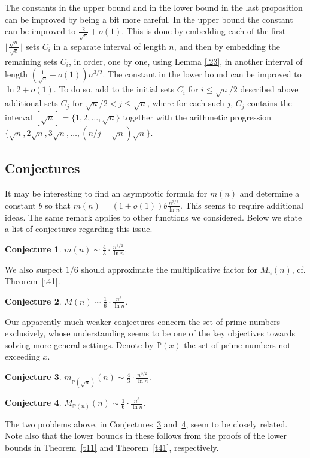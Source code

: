 \documentclass[12pt]{amsart}
\theoremstyle{plain}
\newtheorem{conjecture}{Conjecture}
\numberwithin{equation}{section}
\begin{document}
The constants in the upper bound and in the lower bound in the last proposition can be improved by being a bit more careful. In the upper bound the constant can be improved to $\frac{2}{\sqrt e}+o(1)$. This is done
by embedding each of the first $\lfloor \frac{\sqrt n}{\sqrt e} \rfloor$ sets $C_i$ in a separate interval of length $n$, and then by embedding the remaining sets $C_i$, in order, one by one, using Lemma \ref{l23}, in another interval of length $(\frac{1}{\sqrt e}+o(1))n^{3/2}$. The constant in the lower bound can be improved to $\ln 2+o(1)$. To do so, add to the initial sets $C_i$ for $i \leqslant \sqrt n/2$ described above additional
sets $C_j$ for $\sqrt n/2 <j \leqslant \sqrt n$, where for each such $j$, $C_j$ contains the interval
$[\sqrt n]=\{1,2, \ldots ,\sqrt n\}$ together with the arithmetic progression $\{\sqrt n, 2 \sqrt n, 3 \sqrt n, \ldots, (n/j-\sqrt n) \sqrt n\}$.

\subsection{Conjectures}
	It may be interesting to find an asymptotic formula for $m(n)$ and determine a constant $b$ so that 
	$m(n)=(1+o(1))b \frac{n^{3/2}}{\ln n}$. This seems to require additional ideas. The same remark applies to other functions we considered. Below we state a list of conjectures regarding this issue.
	
	\begin{conjecture}\label{c61}
	$m(n)\sim \frac{4}{3}\cdot \frac{n^{3/2}}{\ln n}$.
	\end{conjecture}
	We also suspect $1/6$ should approximate the multiplicative factor for $M_n(n)$, cf. Theorem~\ref{t41}.
	\begin{conjecture}\label{c62}
		$M(n)\sim \frac{1}{6}\cdot \frac{n^{3}}{\ln n}$.
	\end{conjecture}
	Our apparently much weaker conjectures concern the set of prime numbers exclusively, whose understanding seems to be one of the key objectives towards solving more general settings.
	Denote by $\mathbb{P}(x)$ the set of prime numbers not exceeding $x$.
	\begin{conjecture}\label{c63}
		$m_{\mathbb{P}(\sqrt{n})}(n)\sim \frac{4}{3}\cdot \frac{n^{3/2}}{\ln n}$.
	\end{conjecture}
	\begin{conjecture}\label{c64}
		$M_{\mathbb{P}(n)}(n)\sim \frac{1}{6}\cdot \frac{n^{3}}{\ln n}$.
	\end{conjecture}
	The two problems above, in Conjectures~\ref{c63} and~\ref{c64}, seem to be closely related.
	Note also that the lower bounds in these follows from the proofs of the lower bounds in Theorem~\ref{t11} and Theorem~\ref{t41}, respectively.
	
\end{document}
